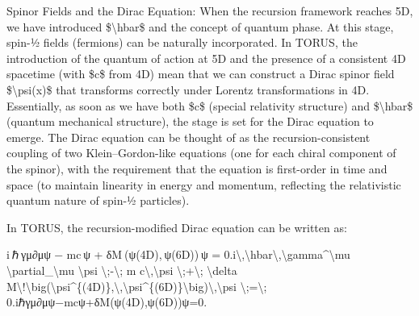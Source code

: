 \documentclass[
]{article}
\begin{document}
Spinor Fields and the Dirac Equation: When the recursion framework
reaches 5D, we have introduced \$\textbackslash hbar\$ and the concept
of quantum phase. At this stage, spin-½ fields (fermions) can be
naturally incorporated. In TORUS, the introduction of the quantum of
action at 5D and the presence of a consistent 4D spacetime (with \$c\$
from 4D) mean that we can construct a Dirac spinor field
\$\textbackslash psi(x)\$ that transforms correctly under Lorentz
transformations in 4D. Essentially, as soon as we have both \$c\$
(special relativity structure) and \$\textbackslash hbar\$ (quantum
mechanical structure), the stage is set for the Dirac equation to
emerge. The Dirac equation can be thought of as the recursion-consistent
coupling of two Klein--Gordon-like equations (one for each chiral
component of the spinor), with the requirement that the equation is
first-order in time and space (to maintain linearity in energy and
momentum, reflecting the relativistic quantum nature of spin-½
particles).

In TORUS, the recursion-modified Dirac equation can be written as:

i ℏ γμ∂μψ  −  mc ψ  +  δM ⁣(ψ(4D), ψ(6D)) ψ  =  0.i\textbackslash,\textbackslash hbar\textbackslash,\textbackslash gamma\^{}\textbackslash mu
\textbackslash partial\_\textbackslash mu \textbackslash psi
\textbackslash;-\textbackslash; m c\textbackslash,\textbackslash psi
\textbackslash;+\textbackslash; \textbackslash delta
M\textbackslash!\textbackslash big(\textbackslash psi\^{}\{(4D)\},\textbackslash,\textbackslash psi\^{}\{(6D)\}\textbackslash big)\textbackslash,\textbackslash psi
\textbackslash;=\textbackslash;
0.iℏγμ∂μ\hspace{0pt}ψ−mcψ+δM(ψ(4D),ψ(6D))ψ=0.
\end{document}
